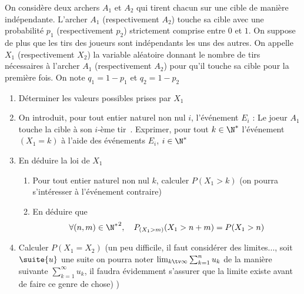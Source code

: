 





\begin{exercice}
On considère deux archers $A_1$ et $A_2$ qui tirent chacun sur une cible de manière indépendante. 
L’archer $A_1$ (respectivement $A_2$) touche sa cible avec une probabilité $p_1$ (respectivement 
$p_2$) strictement comprise entre $0$ et $1$. On suppose de plus que les tirs des joueurs sont 
indépendants les uns des autres. On appelle $X_1$ (respectivement $X_2$) la variable aléatoire donnant 
le nombre de tirs nécessaires à l’archer $A_1$ (respectivement $A_2$) pour qu’il touche sa cible pour la 
première fois. On note $q_1=1-p_1$ et $q_2=1 -p_2$
\begin{enumerate}
\item Déterminer les valeurs possibles prises par $X_1$

\item On introduit, pour tout entier naturel non nul $i$, l'événement $E_i$ : \og Le joeur $A_1$ touche la cible à son $i$-ème tir\fg\, . 
Exprimer, pour tout $k\in \N^*$ l'événement $(X_1=k)$ à l'aide des événements $E_i$, $i\in \N^*$
\item En déduire la loi de $X_1$
\begin{enumerate}
\item Pour tout entier naturel non nul $k$, calculer $P(X_1>k)$ (on pourra s'intéresser à l'événement contraire) 
\item En déduire que 
$$\forall (n,m) \in {\N^*}^2, \quad P_{(X_1>m)} (X_1>n+m) = P(X_1>n)$$
\end{enumerate}
\item Calculer $P(X_1=X_2)$ (un peu difficile, il faut considérer des limites..., soit $\suite{u}$ une suite on pourra noter 
$\lim_{k\tv \infty} \sum_{k=1}^n u_k $ de la manière suivante $\sum_{k=1}^\infty u_k$, il faudra évidemment s'assurer que la limite existe avant de faire ce genre de chose) 
) 
\end{enumerate}
\end{exercice}




